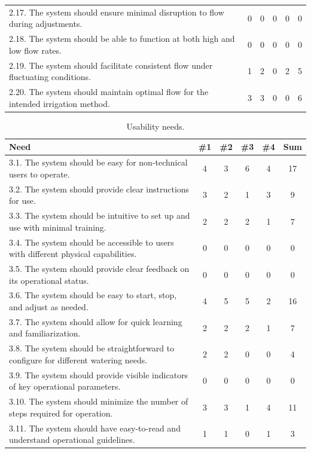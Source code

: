 \documentclass[12pt]{report}
\begin{document}
\begin{table}[H]
\begin{tabular}{|p{10cm}|c|c|c|c|c|}
2.17. The system should ensure minimal disruption to flow during adjustments. & 0 & 0 & 0 & 0 & 0 \\
2.18. The system should be able to function at both high and low flow rates. & 0 & 0 & 0 & 0 & 0 \\
2.19. The system should facilitate consistent flow under fluctuating conditions. & 1 & 2 & 0 & 2 & 5 \\
2.20. The system should maintain optimal flow for the intended irrigation method. & 3 & 3 & 0 & 0 & 6 \\
\hline
\end{tabular}
\end{table}

\renewcommand{\thetable}{\thechapter.1c}
\newpage
\begin{table}[H]
\centering
\caption{Usability needs.}
\label{table:1c}
\begin{tabular}{|p{10cm}|c|c|c|c|c|}
\hline
\textbf{Need} & \textbf{\#1} & \textbf{\#2} & \textbf{\#3} & \textbf{\#4} & \textbf{Sum} \\
\hline
3.1. The system should be easy for non-technical users to operate. & 4 & 3 & 6 & 4 & \cellcolor{yellow}17 \\
3.2. The system should provide clear instructions for use. & 3 & 2 & 1 & 3 & \cellcolor{yellow}9 \\
3.3. The system should be intuitive to set up and use with minimal training. & 2 & 2 & 2 & 1 & 7 \\
3.4. The system should be accessible to users with different physical capabilities. & 0 & 0 & 0 & 0 & 0 \\
3.5. The system should provide clear feedback on its operational status. & 0 & 0 & 0 & 0 & 0 \\
3.6. The system should be easy to start, stop, and adjust as needed. & 4 & 5 & 5 & 2 & \cellcolor{yellow}16 \\
3.7. The system should allow for quick learning and familiarization. & 2 & 2 & 2 & 1 & 7 \\
3.8. The system should be straightforward to configure for different watering needs. & 2 & 2 & 0 & 0 & 4 \\
3.9. The system should provide visible indicators of key operational parameters. & 0 & 0 & 0 & 0 & 0 \\
3.10. The system should minimize the number of steps required for operation. & 3 & 3 & 1 & 4 & \cellcolor{yellow}11 \\
3.11. The system should have easy-to-read and understand operational guidelines. & 1 & 1 & 0 & 1 & 3 \\

\end{tabular}
\end{table}
\end{document}
